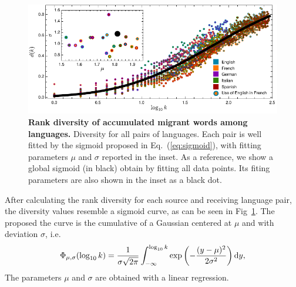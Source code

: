 \documentclass[10pt,letterpaper]{article} %
\newcommand{\eref}[1]{Eq.~(\ref{#1})}
\begin{document}
\begin{figure} %
\centering
\includegraphics[scale=1]{images/Diversity.pdf}
\caption{{\bf Rank diversity of accumulated migrant words among languages.} 
Diversity for all pairs of languages. Each pair is well fitted by the 
sigmoid proposed in \eref{eq:sigmoid}, with fitting parameters $\mu$ and $\sigma$
reported in the inset. As a reference, we show a global sigmoid (in black)
obtain by fitting all data points. Its fiting parameters are also shown in the
inset as a black dot. 
% 
% 
% 
}
\label{fig.DR_art}
\end{figure} %
After calculating the rank diversity for each source and receiving
language pair, the diversity values resemble a sigmoid curve, as can be
seen in Fig~\ref{fig.DR_art}. The proposed the curve is the
cumulative of a Gaussian centered at $\mu$ and with 
deviation $\sigma$, i.e.  
\begin{equation}
\Phi_{\mu,\sigma}(\log_{10} k)=\frac{1}{\sigma\sqrt{2\pi}}
   \int_{-\infty}^{\log_{10}k}\exp\left(-\frac{(y-\mu)^2}{2\sigma^2}\right) {\rm d} y,
   \label{eq:sigmoid}
\end{equation}
The parameters $\mu$ and $\sigma$
are obtained with a linear regression. 
\end{document}
